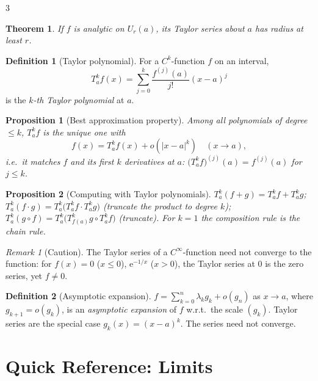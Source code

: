 \documentclass[10pt,a4paper,landscape]{article}
\theoremstyle{definition}
\newtheorem{defn}{Definition}[section]
\theoremstyle{plain}
\newtheorem{thm}{Theorem}[section]
\newtheorem{prop}{Proposition}[section]
\theoremstyle{remark}
\newtheorem{rem}{Remark}[section]
\newcommand{\e}{\mathrm{e}}
\newcommand{\abs}[1]{\lvert #1 \rvert}
\newcommand{\oo}{\infty}
\newcommand{\comp}{\circ}
\newcommand{\ball}[1]{U_{#1}}
\begin{document}
\begin{multicols*}{3}
\begin{thm}
If $f$ is analytic on $\ball{r}(a)$, its Taylor series about $a$ has radius at least $r$.
\end{thm}

\begin{defn}[Taylor polynomial]
For a $C^k$-function $f$ on an interval,
\[
T_a^k f(x) = \sum_{j=0}^{k} \frac{f^{(j)}(a)}{j!} (x-a)^j
\]
is the \emph{$k$-th Taylor polynomial} at $a$.
\end{defn}

\begin{prop}[Best approximation property]
Among all polynomials of degree $\le k$, $T_a^k f$ is the unique one with
\[
f(x) = T_a^k f(x) + o(\abs{x-a}^k) \quad (x \to a),
\]
i.e.\ it matches $f$ and its first $k$ derivatives at $a$: $\bigl(T_a^k f\bigr)^{(j)}(a) = f^{(j)}(a)$ for $j \le k$.
\end{prop}

\begin{prop}[Computing with Taylor polynomials]
$T_a^k(f+g) = T_a^k f + T_a^k g$; $T_a^k(f \cdot g) = T_a^k\bigl(T_a^k f \cdot T_a^k g\bigr)$ (truncate the product to degree $k$); $T_a^k(g \comp f) = T_a^k\bigl(T_{f(a)}^k g \comp T_a^k f\bigr)$ (truncate). For $k=1$ the composition rule is the chain rule.
\end{prop}

\begin{rem}[Caution]
The Taylor series of a $C^{\oo}$-function need not converge to the function: for $f(x) = 0$ ($x\le 0$), $\e^{-1/x}$ ($x>0$), the Taylor series at $0$ is the zero series, yet $f \neq 0$.
\end{rem}

\begin{defn}[Asymptotic expansion]
$f = \sum_{k=0}^{n} \lambda_k g_k + o(g_n)$ as $x \to a$, where $g_{k+1} = o(g_k)$, is an \emph{asymptotic expansion} of $f$ w.r.t.\ the scale $(g_k)$. Taylor series are the special case $g_k(x) = (x-a)^k$. The series need not converge.
\end{defn}

\section{Quick Reference: Limits}


\end{multicols*}
\end{document}
